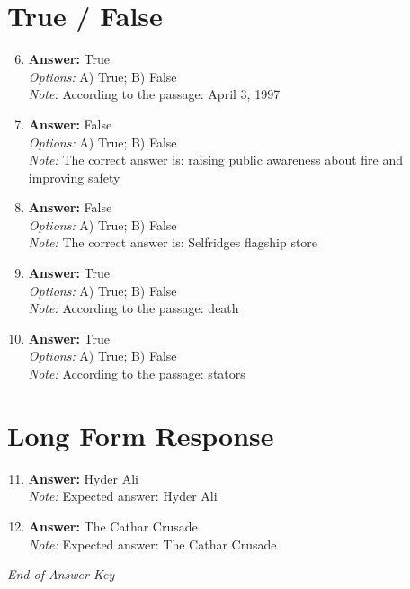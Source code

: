 \documentclass[12pt]{article}
\begin{document}
\section*{True / False}
\begin{enumerate}[label=\arabic*.]
\setcounter{enumi}{5}
\item \textbf{Answer:} True
\\ \textit{Options:} A) True; B) False
\\ \textit{Note:} According to the passage: April 3, 1997
\item \textbf{Answer:} False
\\ \textit{Options:} A) True; B) False
\\ \textit{Note:} The correct answer is: raising public awareness about fire and improving safety
\item \textbf{Answer:} False
\\ \textit{Options:} A) True; B) False
\\ \textit{Note:} The correct answer is: Selfridges flagship store
\item \textbf{Answer:} True
\\ \textit{Options:} A) True; B) False
\\ \textit{Note:} According to the passage: death
\item \textbf{Answer:} True
\\ \textit{Options:} A) True; B) False
\\ \textit{Note:} According to the passage: stators
\end{enumerate}

\section*{Long Form Response}
\begin{enumerate}[label=\arabic*.]
\setcounter{enumi}{10}
\item \textbf{Answer:} Hyder Ali
\\ \textit{Note:} Expected answer: Hyder Ali
\item \textbf{Answer:} The Cathar Crusade
\\ \textit{Note:} Expected answer: The Cathar Crusade
\end{enumerate}

\vfill
\noindent\textit{End of Answer Key}
\end{document}
